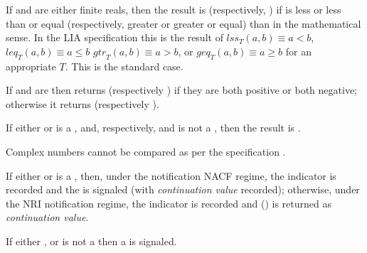 \documentclass[../Comparisons-Predicates.tex]{subfiles}
\begin{document}
  \begin{description}
  \item If  and  are either finite reals, then the result is
   (respectively, ) if  is
  less or less than or equal (respectively, greater or greater or equal)
  than  in the mathematical sense.  In the
  LIA specification this is the result of
  $\mathit{lss}_T(a, b) \equiv a < b$,
  $\mathit{leq}_T(a, b) \equiv a \leq b$
  $\mathit{gtr}_T(a, b) \equiv a > b$, or
  $\mathit{geq}_T(a, b) \equiv a \geq b$
  for an
  appropriate $T$.  This is the standard \CL{} case.
  
  \item If  and  are  then
  \code{=} returns  (respectively ) if they
  are both positive or both negative; otherwise it returns
   (respectively ).
  
  \item If either  or  is a ,
  and, respectively,  and  is not a
  , then the result is .
  
  \item Complex numbers cannot be compared as per the \CL{}
    specification \cite{1996:ANSIHyperSpec}.
  \end{description}
  
  \DExceptional{}
  
  If either  or  is a , then, under the notification NACF regime, the indicator
   is recorded and the
   is signaled (with
  \emph{continuation value}  recorded); otherwise, under the
  NRI notification regime, the indicator  is recorded and
   () is returned as \emph{continuation value}.
  
  If either , or  is not a  then a
   is signaled.
  
\end{document}
